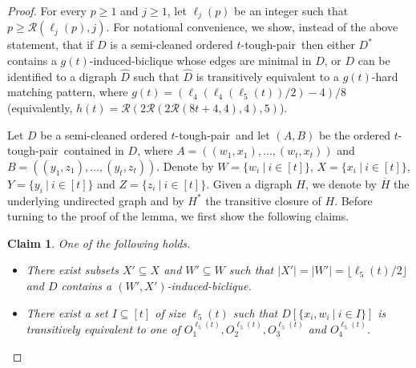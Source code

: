 \documentclass[a4paper,11pt]{article}
\theoremstyle{plain}
\newtheorem{claim}[theorem]{Claim}
\newtheorem{identification rule}{Identification Rule}
\theoremstyle{definition}
\theoremstyle{remark}
\newcommand{\toughpair}{tough-pair}
\begin{document}
\begin{proof}
For every $p \geq 1$ and $j \geq 1$, let $\ell_j(p)$ be an integer such that $p \geq \mathcal{R}(\ell_j(p),j)$.
For notational convenience, we show, instead of the above statement, that if $D$ is a semi-cleaned ordered $t$-\toughpair\ then either $D^*$ contains a $g(t)$-induced-biclique whose edges are minimal in $D$, or $D$ can be identified to a digraph $\hat{D}$ such that $\hat{D}$ is transitively equivalent to a $g(t)$-hard matching pattern, where $g(t) = (\ell_4(\ell_4(\ell_5(t))/2)-4)/8$ (equivalently, $h(t) = \mathcal{R}(2\mathcal{R}(2\mathcal{R}(8t+4,4),4),5)$).

Let $D$ be a semi-cleaned ordered $t$-\toughpair\ and let $(A,B)$ be the ordered $t$-\toughpair\ contained in $D$,
where $A = ((w_1,x_1),\ldots,(w_t,x_t))$ and $B = ((y_1,z_1),\ldots,(y_t,z_t))$.
Denote by $W= \{w_i~|~i \in [t]\}$, $X = \{x_i~|~i \in [t]\}$, $Y= \{y_i~|~i \in [t]\}$ and $Z= \{z_i~|~i\in [t]\}$.
Given a digraph $H$, we denote by $\overline{H}$ the underlying undirected graph and by $H^*$ the transitive closure of $H$. Before turning to the proof of the lemma, we first show the following claims. 

\begin{claim}
\label{clm:ramseyA}
One of the following holds.
\begin{itemize}
\item[(1)] There exist subsets $X' \subseteq X$ and $W' \subseteq W$ such that $|X'| = |W'| = \lfloor \ell_5(t)/2 \rfloor$ and $D$ contains a $(W',X')$-induced-biclique.
\item[(2)] There exist a set $I \subseteq [t]$ of size $\ell_5(t)$ such that $D[\{x_i,w_i~|~i \in I\}]$ is transitively equivalent to one of $O_1^{\ell_5(t)},O_2^{\ell_5(t)},O_3^{\ell_5(t)}$ and $O_4^{\ell_5(t)}$.
\end{itemize}
\end{claim}


\end{proof}
\end{document}
